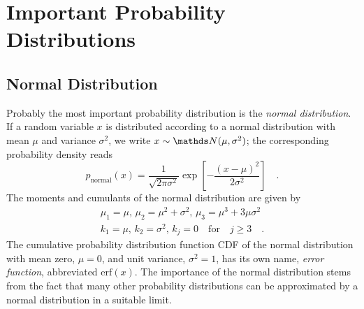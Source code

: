 \documentclass{notebook}
\begin{document}

\section{Important Probability Distributions}

\subsection*{Normal Distribution}
Probably the most important probability distribution is the \textit{normal distribution}.
If a random variable $x$ is distributed according to a normal distribution with mean $\mu$ and variance $\sigma^2$,
we write $x\sim\N(\mu, \sigma^2)$;  the corresponding probability density reads
%
\begin{equation}
p_\mathrm{normal}(x) = \frac{1}{\sqrt{2 \pi \sigma^2}} \exp[- \frac{(x- \mu)^2}{2 \sigma^2}] \quad.
\end{equation}
%
The moments and cumulants of the normal distribution are given by
%
\begin{gather*}
	\mu_1 = \mu, \, \mu_2 = \mu^2 + \sigma^2, \, \mu_3 = \mu^3 + 3 \mu \sigma^2 \\
	k_1 = \mu, \, k_2 = \sigma^2, \, k_j = 0 \quad \mathrm{for} \quad j \geq 3 \quad.
\end{gather*}
%
The cumulative probability distribution function CDF of the normal distribution  with mean zero, $\mu=0$, and unit variance, $\sigma^2=1$, has its own name, \textit{error function}, abbreviated $\mathrm{erf}(x)$. The importance of the normal distribution stems from the fact that  many other probability distributions can be approximated by a normal distribution in a suitable limit.
\end{document}
